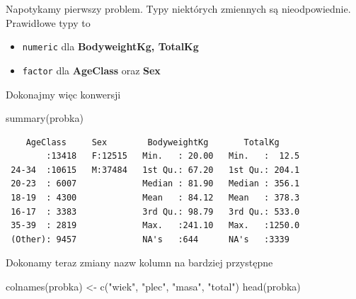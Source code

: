\documentclass[
  letterpaper,
  DIV=11,
  numbers=noendperiod]{scrartcl}
\newenvironment{Shaded}{\begin{snugshade}}{\end{snugshade}}
\newcommand{\FunctionTok}[1]{\textcolor[rgb]{0.28,0.35,0.67}{#1}}
\newcommand{\NormalTok}[1]{\textcolor[rgb]{0.00,0.23,0.31}{#1}}
\newcommand{\OtherTok}[1]{\textcolor[rgb]{0.00,0.23,0.31}{#1}}
\newcommand{\SpecialCharTok}[1]{\textcolor[rgb]{0.37,0.37,0.37}{#1}}
\newcommand{\StringTok}[1]{\textcolor[rgb]{0.13,0.47,0.30}{#1}}
\begin{document}
Napotykamy pierwszy problem. Typy niektórych zmiennych są
nieodpowiednie. Prawidłowe typy to

\begin{itemize}
\item
  \texttt{numeric} dla \textbf{BodyweightKg, TotalKg}
\item
  \texttt{factor} dla \textbf{AgeClass} oraz \textbf{Sex}
\end{itemize}

Dokonajmy więc konwersji

\begin{Shaded}
\end{Shaded}

\begin{Shaded}
\begin{Highlighting}[]
\FunctionTok{summary}\NormalTok{(probka)}
\end{Highlighting}
\end{Shaded}

\begin{verbatim}
    AgeClass     Sex        BodyweightKg       TotalKg      
        :13418   F:12515   Min.   : 20.00   Min.   :  12.5  
 24-34  :10615   M:37484   1st Qu.: 67.20   1st Qu.: 204.1  
 20-23  : 6007             Median : 81.90   Median : 356.1  
 18-19  : 4300             Mean   : 84.12   Mean   : 378.3  
 16-17  : 3383             3rd Qu.: 98.79   3rd Qu.: 533.0  
 35-39  : 2819             Max.   :241.10   Max.   :1250.0  
 (Other): 9457             NA's   :644      NA's   :3339    
\end{verbatim}

Dokonamy teraz zmiany nazw kolumn na bardziej przystępne

\begin{Shaded}
\begin{Highlighting}[]
\FunctionTok{colnames}\NormalTok{(probka) }\OtherTok{\textless{}{-}} \FunctionTok{c}\NormalTok{(}\StringTok{"wiek"}\NormalTok{, }\StringTok{"plec"}\NormalTok{, }\StringTok{"masa"}\NormalTok{, }\StringTok{"total"}\NormalTok{)}
\FunctionTok{head}\NormalTok{(probka)}
\end{Highlighting}
\end{Shaded}
\end{document}
